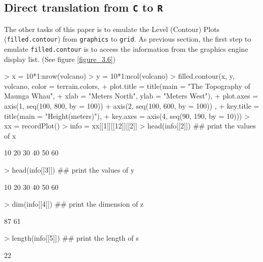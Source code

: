 \documentclass[paper=a4, fontsize=11pt]{report}
\begin{document}
\subsection{Direct translation from \texttt{C} to \texttt{R}}
The other tasks of this paper is to emulate the Level (Contour) Plots (\texttt{filled.contour}) from \texttt{graphics} to \texttt{grid}. As previous section, the first step to emulate \texttt{filled.contour} is to access the information from the graphics engine display list. (See figure \ref{figure_3.6})
\begin{Schunk}
\begin{Sinput}
> x = 10*1:nrow(volcano)
> y = 10*1:ncol(volcano)
> filled.contour(x, y, volcano, color = terrain.colors,
+ plot.title = title(main = "The Topography of Maunga Whau",
+ xlab = "Meters North", ylab = "Meters West"),
+ plot.axes = { axis(1, seq(100, 800, by = 100))
+ 	axis(2, seq(100, 600, by = 100)) },
+ key.title = title(main = "Height\n(meters)"),
+ key.axes = axis(4, seq(90, 190, by = 10)))
> xx = recordPlot()
> info = xx[[1]][[12]][[2]]
> head(info[[2]])  ## print the values of x
\end{Sinput}
\begin{Soutput}
[1] 10 20 30 40 50 60
\end{Soutput}
\begin{Sinput}
> head(info[[3]])  ## print the values of y
\end{Sinput}
\begin{Soutput}
[1] 10 20 30 40 50 60
\end{Soutput}
\begin{Sinput}
> dim(info[[4]])  ## print the dimension of z
\end{Sinput}
\begin{Soutput}
[1] 87 61
\end{Soutput}
\begin{Sinput}
> length(info[[5]])  ## print the length of s
\end{Sinput}
\begin{Soutput}
[1] 22
\end{Soutput}
\end{Schunk}
\end{document}
